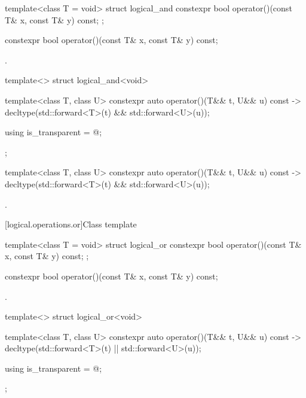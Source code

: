 %
\begin{itemdecl}
template<class T = void> struct logical_and {
  constexpr bool operator()(const T& x, const T& y) const;
};
\end{itemdecl}

%
\begin{itemdecl}
constexpr bool operator()(const T& x, const T& y) const;
\end{itemdecl}

\begin{itemdescr}
\pnum
\returns
{}.
\end{itemdescr}

%
\begin{itemdecl}
template<> struct logical_and<void> {
  template<class T, class U> constexpr auto operator()(T&& t, U&& u) const
    -> decltype(std::forward<T>(t) && std::forward<U>(u));

  using is_transparent = @\unspec@;
};
\end{itemdecl}

%
\begin{itemdecl}
template<class T, class U> constexpr auto operator()(T&& t, U&& u) const
    -> decltype(std::forward<T>(t) && std::forward<U>(u));
\end{itemdecl}

\begin{itemdescr}
\pnum
\returns
{}.
\end{itemdescr}

[logical.operations.or]{Class template }

%
\begin{itemdecl}
template<class T = void> struct logical_or {
  constexpr bool operator()(const T& x, const T& y) const;
};
\end{itemdecl}

%
\begin{itemdecl}
constexpr bool operator()(const T& x, const T& y) const;
\end{itemdecl}

\begin{itemdescr}
\pnum
\returns
{}.
\end{itemdescr}

%
\begin{itemdecl}
template<> struct logical_or<void> {
  template<class T, class U> constexpr auto operator()(T&& t, U&& u) const
    -> decltype(std::forward<T>(t) || std::forward<U>(u));

  using is_transparent = @\unspec@;
};
\end{itemdecl}

